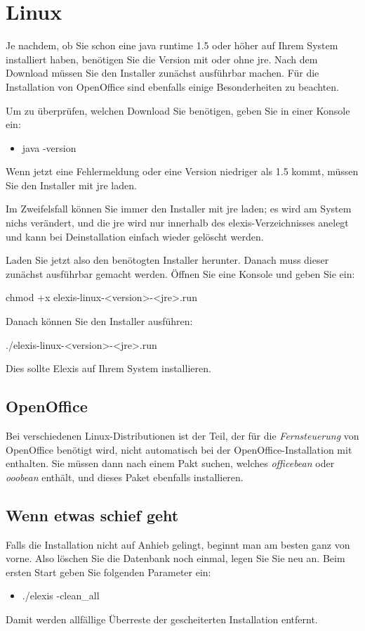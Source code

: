 \section{Linux}
Je nachdem, ob Sie schon eine java runtime 1.5 oder höher auf Ihrem System installiert haben, benötigen Sie die Version mit oder ohne jre. Nach dem Download müssen Sie den Installer zunächst ausführbar machen. Für die Installation von OpenOffice sind ebenfalls einige Besonderheiten zu beachten.

Um zu überprüfen, welchen Download Sie benötigen, geben Sie in einer Konsole ein:
\begin{itemize}
\item java -version
\end{itemize}

Wenn jetzt eine Fehlermeldung oder eine Version niedriger als 1.5 kommt, müssen Sie den Installer mit jre laden.


Im Zweifelsfall können Sie immer den Installer mit jre laden; es wird am System nichs verändert, und die jre wird nur innerhalb des elexis-Verzeichnisses anelegt und kann bei Deinstallation einfach wieder gelöscht werden.


Laden Sie jetzt also den benötogten Installer herunter. Danach muss dieser zunächst ausführbar gemacht werden. Öffnen Sie eine Konsole und geben Sie ein:

chmod +x elexis-linux-<version>-<jre>.run

 Danach können Sie den Installer ausführen:

./elexis-linux-<version>-<jre>.run

Dies sollte Elexis auf Ihrem System installieren.

\subsection{OpenOffice}
Bei verschiedenen Linux-Distributionen ist der Teil, der für die  \textit{Fernsteuerung}  von OpenOffice benötigt wird, nicht automatisch bei der OpenOffice-Installation mit enthalten. Sie müssen dann nach einem Pakt suchen, welches  \textit{officebean}  oder  \textit{ooobean}  enthält, und dieses Paket ebenfalls installieren.

\subsection{Wenn etwas schief geht}
Falls die Installation nicht auf Anhieb gelingt, beginnt man am besten ganz von vorne. Also löschen Sie die Datenbank noch einmal, legen Sie Sie neu an. Beim ersten Start geben Sie folgenden Parameter ein:
\begin{itemize}
 \item ./elexis -clean\_all
\end{itemize}
Damit werden allfällige Überreste der gescheiterten Installation entfernt.

